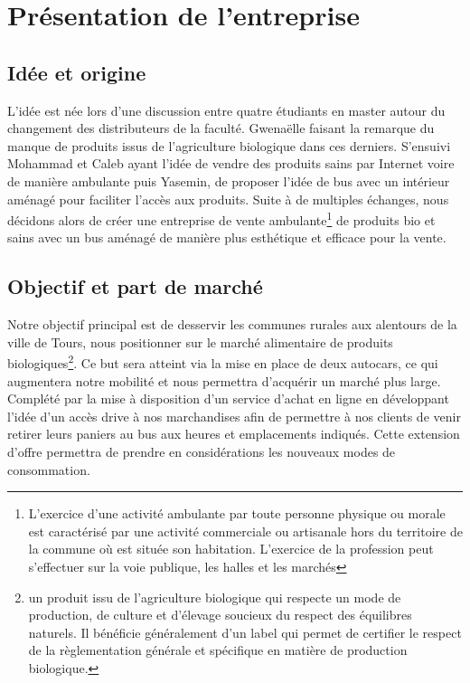 \documentclass[12pt,a4paper]{report}
\begin{document}
	\tableofcontents

	\chapter{Présentation de l'entreprise}


		\section{Idée et origine}
			L'idée est née lors d'une discussion entre quatre étudiants en master autour du changement des distributeurs de la faculté. Gwenaëlle faisant la remarque du manque de produits issus de l'agriculture biologique dans ces derniers. S'ensuivi Mohammad et Caleb ayant l'idée de vendre des produits sains par Internet voire de manière ambulante puis Yasemin, de proposer l'idée de bus avec un intérieur aménagé pour faciliter l'accès aux produits. 
			Suite à de multiples échanges,  nous décidons alors de créer une entreprise de vente ambulante\footnote{L’exercice d’une activité ambulante par toute personne physique ou morale est caractérisé par une activité commerciale ou artisanale hors du territoire de la commune où est située son habitation. L’exercice de la profession peut s’effectuer sur la voie publique, les halles et les marchés} de produits bio et sains avec un bus aménagé de manière plus esthétique et efficace pour la vente. 
		
		\section{Objectif et part de marché}
		Notre objectif principal est de desservir les communes rurales aux alentours de la ville de Tours, nous positionner sur le marché alimentaire de produits biologiques\footnote{un produit issu de l’agriculture biologique qui respecte un mode de production, de culture et d’élevage soucieux du respect des équilibres naturels. Il bénéficie généralement d’un label qui permet de certifier le respect de la règlementation générale et spécifique en matière de production biologique.}.
		Ce but sera atteint via la mise en place de deux autocars, ce qui augmentera notre mobilité et  nous permettra d'acquérir un marché plus large. Complété par la mise à disposition d'un service d'achat en ligne en développant l'idée d'un accès \og drive\fg{} à nos marchandises afin de permettre à nos clients de venir retirer leurs paniers au bus aux heures et emplacements indiqués. Cette extension d'offre permettra de prendre en considérations les nouveaux modes de consommation.
		
\end{document}
